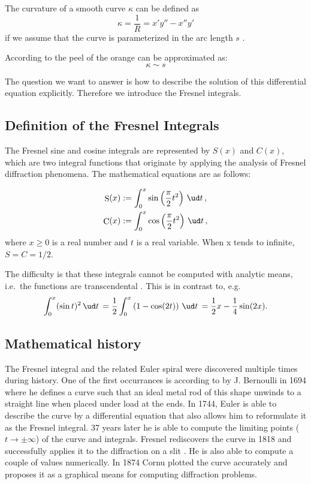 \documentclass[12pt]{article}
\DeclareMathOperator\Cee{C} %
\def\d#1{{\,\ud#1\,}}
\DeclareMathOperator\eS{S} %
\begin{document}
The curvature of a smooth curve $\kappa$ can be defined as 
\[  \kappa=\frac1R = x'y'' -x''y'
\] if we assume that the curve is parameterized in the arc length $s$ \cite{BH12}.

According to \cite{BH12} the peel of the orange can be approximated as:
\begin{equation}
  \kappa \sim s  \label{e:eulerSpiral}
\end{equation}

The question we want to answer is how to describe the solution of this differential equation explicitly.  Therefore we introduce the Fresnel integrals.


\subsection{Definition of the Fresnel Integrals}
The Fresnel sine and cosine integrals are represented by  $S(x)$ and $C(x)$, which are two integral functions that originate by applying the analysis of Fresnel diffraction phenomena. The mathematical equations are as follows:

\begin{align}
\eS(x) &:= \int_0^x  \sin\left(\frac\pi2 t^2\right) \d{t}, \\
\Cee(x) &:= \int_0^x \cos\left(\frac\pi2 t^2\right) \d{t},
\end{align}
where $x \ge 0$ is a real number and $t$ is a real variable. When x tends to infinite, $S=C=1/2$.

The difficulty is that these integrals cannot be computed with analytic means, i.e.~the functions are transcendental \cite[p.195ff]{AS}.  This is in contrast to, e.g.
$$ \int_0^x (\sin t)^2 \d{t} = \frac12\int_0^x \left(1-\cos(2t)\right)\d{t} = \frac12x -\frac14\sin(2x).
$$


\subsection{Mathematical history}
The Fresnel integral and the related Euler spiral were discovered multiple times during history.  One of the first occurrances is according to \cite{Lev08} by J. Bernoulli in 1694 where he defines a curve such that an ideal metal rod of this shape unwinds to a straight line when placed under load at the ends.  In 1744, Euler is able to describe the curve by a differential equation that also allows him to reformulate it as the Fresnel integral.  37 years later he is able to compute the limiting points ($t\to\pm\infty$) of the curve and integrals.  Fresnel rediscovers the curve in 1818 and successfully applies it to the diffraction on a slit \cite{Lev08}.  He is also able to compute a couple of values numerically.  In 1874 Cornu plotted the curve accurately and proposes it as a graphical means for computing diffraction problems.
\end{document}
